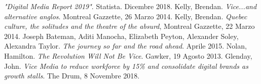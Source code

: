 \documentclass[a4paper, 11pt]{article}
\begin{document}
\begin{thebibliography}{9}
 \emph{"Digital Media Report 2019"}. Statista. Dicembre 2018.
 Kelly, Brendan. \textit{Vice...and alternative anglos}. Montreal Gazzette, 26 Marzo 2014.
 Kelly, Brendan. \textit{Quebec culture, the solitudes and the theatre of the absurd}, Montreal Gazzette, 22 Marzo 2014.
 Joseph Bateman, Aditi Manocha, Elizabeth Peyton,
Alexander Soley, Alexandra Taylor. \textit{The journey so far and the road ahead}. Aprile 2015. 
 Nolan, Hamilton. \textit{The Revolution Will Not Be Vice}. Gawker, 19 Agosto 2013. 
 Glenday, John. \textit{Vice Media to reduce workforce by 15\% and consolidate digital brands as growth stalls}. The Drum, 8 Novembre 2018.

\end{thebibliography}
\end{document}
